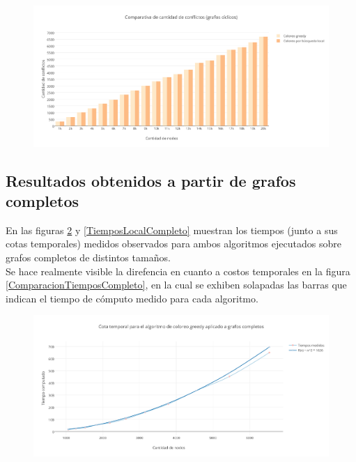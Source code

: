  \begin{figure}[H]
    \begin{center}
  	\includegraphics[width=18cm]{imagenes/Ej5/ComparacionConflictosCiclico.png}
 	\label{ComparacionConflictosCiclico}
    \end{center}
  \end{figure}


\subsection {Resultados obtenidos a partir de grafos completos} 

En las figuras \ref{TiempoGreedyCompleto} y \ref{TiemposLocalCompleto} muestran los tiempos (junto a sus cotas temporales) medidos observados para ambos algoritmos ejecutados sobre grafos completos de distintos tamaños.\\
Se hace realmente visible la direfencia en cuanto a costos temporales en la figura \ref{ComparacionTiemposCompleto}, en la cual se exhiben solapadas las barras que indican el tiempo de cómputo medido para cada algoritmo.

 \begin{figure}[H]
    \begin{center}
  	\includegraphics[width=18cm]{imagenes/Ej5/TiempoGreedyCompleto.png}
 	\label{TiempoGreedyCompleto}
    \end{center}
  \end{figure}

